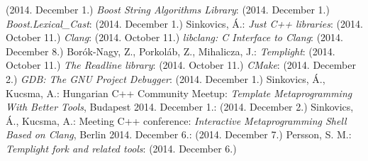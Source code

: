 \begin{thebibliography}{99}
    (2014. December 1.)
    \textit{Boost String Algorithms Library}:
    (2014. December 1.)
    \textit{Boost.Lexical\_Cast}:
    (2014. December 1.)
    Sinkovics, Á.:
    \textit{Just C++ libraries}:
     (2014. October 11.)
    \textit{Clang}:
     (2014. October 11.)
    \textit{libclang: C Interface to Clang}:
     (2014. December 8.)
    Borók-Nagy, Z., Porkoláb, Z., Mihalicza, J.:
    \textit{Templight}:
     (2014. October 11.)
    \textit{The Readline library}:
    (2014. October 11.)
    \textit{CMake}:
    (2014. December 2.)
    \textit{GDB: The GNU Project Debugger}:
    (2014. December 1.)
    Sinkovics, Á., Kucsma, A.:
    Hungarian C++ Community Meetup:
    \textit{Template Metaprogramming With Better Tools}, Budapest 2014.
    December 1.:
    (2014. December 2.)
    Sinkovics, Á., Kucsma, A.:
    Meeting C++ conference:
    \textit{Interactive Metaprogramming Shell Based on Clang}, Berlin 2014.
    December 6.:
    (2014. December 7.)
    Persson, S. M.:
    \textit{Templight fork and related tools}:
    (2014. December 6.)
\end{thebibliography}
